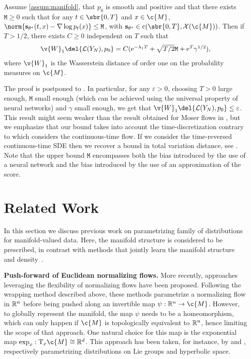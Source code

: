 \begin{theorem}
	\label{thm:weak_qualitative}
	Assume \cref{assum:manifold}, that $p_0$ is smooth and positive and that there exists $\mathtt{M} \geq 0$ such that for any $t \in \sbr{0,T}$ and $x \in \c{M}$, $\norm{\mathbf{s}_{\theta^{\star}}(t,x) - \nabla \log p_{t}(x)} \leq \mathtt{M}$, with $\mathbf{s}_{\theta^\star} \in \mathrm{c}(\sbr{0,T}, \mathcal{X}(\c{M}))$.
	Then if $T > 1/2$, there exists $C \geq 0$ independent on $T$ such that \begin{equation} \textstyle{\v{W}_1\del{\mathcal{L}(Y_N), p_0} = C ( \mathrm{e}^{-\lambda_1 T} + \sqrt{T/2} \mathtt{M} + \mathrm{e}^T \gamma^{1/2}) , } \end{equation} where $\v{W}_1$ is the Wasserstein distance of order one on the probability measures on $\c{M}$.
\end{theorem}

The proof is postponed to .
In particular, for any $\varepsilon > 0$, choosing $T > 0$ large enough, $\mathtt{M}$ small enough (which can be achieved using the universal property of neural networks) and $\gamma$ small enough, we get that $\v{W}_1\del{\mathcal{L}(Y_N), p_0} \leq \varepsilon$.
This result might seem weaker than the result obtained for Moser flows in \textcite[Theorem 3]{rozen2021moser}, but we emphasize that our bound takes into account the time-discretization contrary to \textcite{rozen2021moser} which considers the continuous-time flow.
If we consider the time-reversed continuous-time SDE then we recover a bound in total variation distance, see .
Note that the upper bound $\mathtt{M}$ encompasses both the bias introduced by the use of a neural network and the bias introduced by the use of an approximation of the score.

\section{Related Work}
\label{sec:related-works}

In this section we discuss previous work on parametrizing family of distributions for manifold-valued data.
Here, the manifold structure is considered to be prescribed, in contrast with methods that jointly learn the manifold structure and density~\parencite[e.g.][]{brehmer2020flows,caterini2021Rectangular}.

\textbf{Push-forward of Euclidean normalizing flows.}
More recently, approaches leveraging the flexibility of normalizing flows \parencite{papamakarios2019normalizing} have been proposed.
Following the wrapping method described above, these methods parametrize a normalizing flow in $\mathbb{R}^n$ before being pushed along an invertible map $\psi: \R^n \rightarrow \c{M}$.
However, to globally represent the manifold, the map $\psi$ needs to be a homeomorphism, which can only happen if $\c{M}$ is topologically equivalent to $\mathbb{R}^n$, hence limiting the scope of that approach.
One natural choice for this map is the exponential map $\exp_x: \mathrm{T}_x \c{M} \cong \R^d$.
This approach has been taken, for instance, by \textcite{falorsi2019reparameterizing} and \textcite{bose2020latent}, respectively parametrizing distributions on Lie groups and hyperbolic space.

